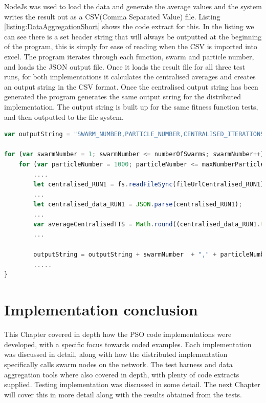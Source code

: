 \documentclass[oneside,12pt]{book}
\begin{document}
NodeJs was used to load the data and generate the average values and the system writes the result out as a CSV(Comma Separated Value) file. Listing \ref{listing:DataAggregationShort} shows the code extract for this. In the listing we can see there is a set header string that will always be outputted at the beginning of the program, this is simply for ease of reading when the CSV is imported into excel. The program iterates through each function, swarm and particle number, and loads the JSON output file. Once it loads the result file for all three test runs, for both implementations it calculates the centralised averages and creates an output string in the CSV format. Once the centralised output string has been generated the program generates the same output string for the distributed implementation. The output string is built up for the same fitness function tests, and then outputted to the file system. 

\begin{lstlisting}[basicstyle=\footnotesize, language=JavaScript]
var outputString = "SWARM_NUMBER,PARTICLE_NUMBER,CENTRALISED_ITERATIONS,CENTRALISED_TIME_TO_SOLUTION,CENTRALISED_FINAL_GROUP_BEST,DISTRIBUTED_ITERATIONS,DISTRIBUTED_TIME_TO_SOLUTION,DISTRIBUTED_FINAL_GROUP_BEST\n";

for (var swarmNumber = 1; swarmNumber <= numberOfSwarms; swarmNumber++) {
    for (var particleNumber = 1000; particleNumber <= maxNumberParticles; particleNumber += particleIncrement) {
        ....
        let centralised_RUN1 = fs.readFileSync(fileUrlCentralised_RUN1);
        ...
        let centralised_data_RUN1 = JSON.parse(centralised_RUN1);
        ...
        var averageCentralisedTTS = Math.round((centralised_data_RUN1.timeToSolution + centralised_data_RUN2.timeToSolution + centralised_data_RUN3.timeToSolution)/3);
        ...

        outputString = outputString + swarmNumber  + "," + particleNumber + "," + averageCentralisedIterations + "," + averageCentralisedTTS + "," + averageCentralisedGbest + ",";
        .....
}
\end{lstlisting}
\label{listing:DataAggregationShort}

\section{Implementation conclusion}
This Chapter covered in depth how the PSO code implementations were developed, with a specific focus towards coded examples. Each implementation was discussed in detail, along with how the distributed implementation specifically calls swarm nodes on the network. The test harness and data aggregation tools where also covered in depth, with plenty of code extracts supplied. Testing implementation was discussed in some detail. The next Chapter will cover this in more detail along with the results obtained from the tests.
\end{document}
